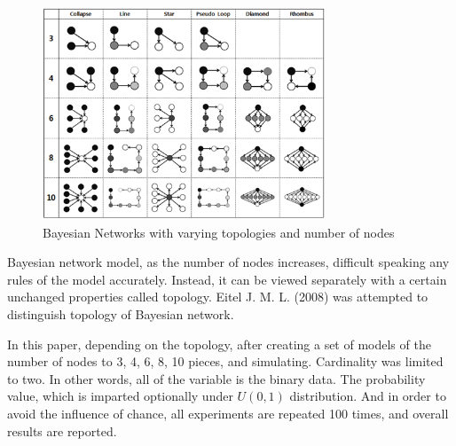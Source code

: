 	\begin{figure}[!h]
	\centering
		\includegraphics[height=180pt]{Topologies}
		\caption{Bayesian Networks with varying topologies and number of nodes}
	\end{figure}

Bayesian network model, as the number of nodes increases, difficult speaking any rules of the model accurately. Instead, it can be viewed separately with a certain unchanged properties called topology.
Eitel J. M. L. (2008) was attempted to distinguish topology of Bayesian network.

In this paper, depending on the topology, after creating a set of models of the number of nodes to 3, 4, 6, 8, 10 pieces, and simulating. Cardinality was limited to two. In other words, all of the variable is the binary data. The probability value, which is imparted optionally under $ U (0,1) $ distribution. And in order to avoid the influence of chance, all experiments are repeated 100 times, and overall results are reported.
